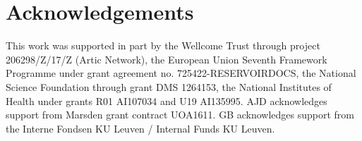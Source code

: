 \documentclass{bioinfo_tracer}
\begin{document}


\vspace{-0.35cm}

\section*{Acknowledgements}

This work was supported in part by the Wellcome Trust through project 206298/Z/17/Z (Artic Network), the European Union Seventh Framework Programme under grant agreement no. 725422-RESERVOIRDOCS, the National Science Foundation through grant DMS 1264153, the National Institutes of Health under grants R01 AI107034 and U19 AI135995. AJD acknowledges support from Marsden grant contract UOA1611.
GB acknowledges support from the Interne Fondsen KU Leuven / Internal Funds KU Leuven.


\vspace{-0.35cm}



\end{document}
